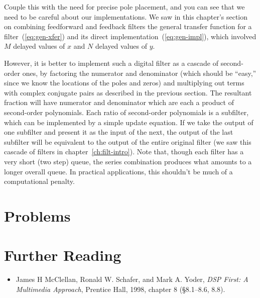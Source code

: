 Couple this with the need for precise pole placement, and you
can see that we need to be careful about our implementations. We saw
in this chapter's section on combining feedforward and feedback
filters the general transfer function for a filter~(\ref{eq:gen-xfer})
and its direct implementation~(\ref{eq:gen-impl}), which involved
$M$ delayed values of $x$ and $N$ delayed values of $y$.

However, it is better to implement such a digital filter as a cascade
of second-order ones, by factoring the numerator and denominator
(which should be ``easy,'' since we know the locations of the poles
and zeros) and multiplying out terms with complex conjugate pairs as
described in the previous section. The resultant fraction will have
numerator and denominator which are each a product of second-order
polynomials.  Each ratio of second-order polynomials is a subfilter,
which can be implemented by a simple update equation. If we take the
output of one subfilter and present it as the input of the next, the
output of the last subfilter will be equivalent to the output of the
entire original filter (we saw this cascade of filters in
chapter~\ref{ch:filt-intro}). Note that, though each filter has a very
short (two step) queue, the series combination produces what amounts
to a longer overall queue. In practical applications, this shouldn't
be much of a computational penalty.

\section{Problems}


\section{Further Reading}

\begin{itemize}
\item James H McClellan, Ronald W. Schafer, and Mark A. Yoder,
  \textit{DSP First: A Multimedia Approach}, Prentice Hall, 1998,
  chapter 8 (\S 8.1--8.6, 8.8).
\end{itemize}


